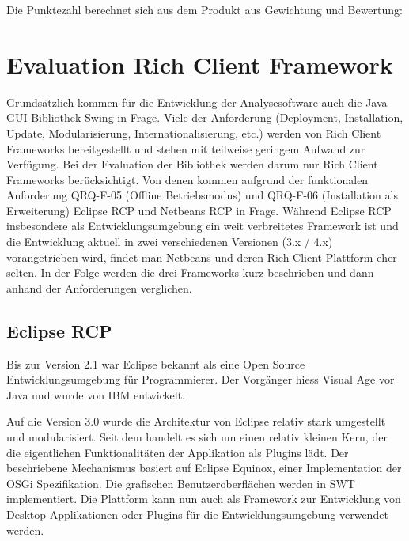 Die Punktezahl berechnet sich aus dem Produkt aus Gewichtung und Bewertung:
\begin{center}
\end{center}
\section{Evaluation Rich Client Framework}
Grundsätzlich kommen für die Entwicklung der Analysesoftware auch die Java GUI-Bibliothek Swing in Frage. Viele der Anforderung (Deployment, Installation, Update, Modularisierung, Internationalisierung, etc.) werden von Rich Client Frameworks bereitgestellt und stehen mit teilweise geringem Aufwand zur Verfügung. Bei der Evaluation der Bibliothek werden darum nur Rich Client Frameworks berücksichtigt. Von denen kommen aufgrund der funktionalen Anforderung QRQ-F-05 (Offline Betriebsmodus) und QRQ-F-06 (Installation als Erweiterung) Eclipse RCP und Netbeans RCP in Frage. Während Eclipse RCP insbesondere als Entwicklungsumgebung ein weit verbreitetes Framework ist und die Entwicklung aktuell in zwei verschiedenen Versionen (3.x / 4.x) vorangetrieben wird, findet man Netbeans und deren Rich Client Plattform eher selten. In der Folge werden die drei Frameworks kurz beschrieben und dann anhand der Anforderungen verglichen.


\subsection{Eclipse RCP}
Bis zur Version 2.1 war Eclipse bekannt als eine Open Source Entwicklungsumgebung für Programmierer. Der Vorgänger hiess Visual Age vor Java und wurde von IBM entwickelt. 

Auf die Version 3.0 wurde die Architektur von Eclipse relativ stark umgestellt und modularisiert. Seit dem handelt es sich um einen relativ kleinen Kern, der die eigentlichen Funktionalitäten der Applikation als Plugins lädt. Der beschriebene Mechanismus basiert auf Eclipse Equinox, einer Implementation der OSGi Spezifikation. Die grafischen Benutzeroberflächen werden in SWT implementiert. Die Plattform kann nun auch als Framework zur Entwicklung von Desktop Applikationen oder Plugins für die Entwicklungsumgebung  verwendet werden.

